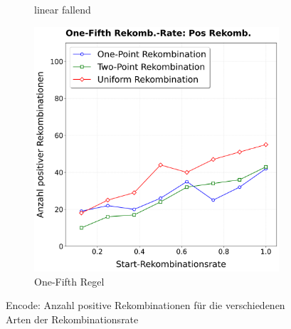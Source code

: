 \begin{figure}[H]
\begin{subfigure}[b]{0.32\textwidth}
		\caption{linear fallend}
		\label{fig:encodePosRekombinationClegg}
	\end{subfigure}%
	\hfill
	\begin{subfigure}[b]{0.32\textwidth}
		\includegraphics[width=\textwidth]{Bilder/EncodePlotPositiveRekombinationOneFifth.png}
		\caption{One-Fifth Regel}
		\label{fig:encodePosRekombinationOneFifth}
	\end{subfigure}
	\caption{Encode: Anzahl positive Rekombinationen für die verschiedenen Arten der Rekombinationsrate}
	\label{fig:encodePosRekombination}
\end{figure}

